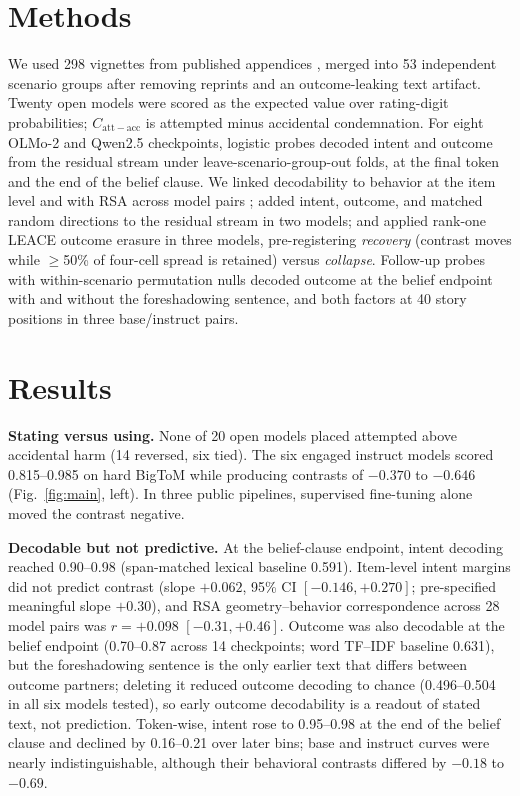 \documentclass{ccn}
\newcommand{\contrast}{C_{\mathrm{att-acc}}}
\begin{document}
\section{Methods}

We used 298 vignettes from published appendices \citep{young2008belief,young2009innocent,young2011ignorance}, merged into 53 independent scenario groups after removing reprints and an outcome-leaking text artifact.
Twenty open models were scored as the expected value over rating-digit probabilities; $\contrast$ is attempted minus accidental condemnation.
For eight OLMo-2 and Qwen2.5 checkpoints, logistic probes decoded intent and outcome from the residual stream under leave-scenario-group-out folds, at the final token and the end of the belief clause.
We linked decodability to behavior at the item level and with RSA across model pairs \citep{kriegeskorte2008rsa}; added intent, outcome, and matched random directions to the residual stream in two models; and applied rank-one LEACE outcome erasure \citep{belrose2023leace} in three models, pre-registering \emph{recovery} (contrast moves while $\geq$50\% of four-cell spread is retained) versus \emph{collapse}.
Follow-up probes with within-scenario permutation nulls decoded outcome at the belief endpoint with and without the foreshadowing sentence, and both factors at 40 story positions in three base/instruct pairs.

\section{Results}

\textbf{Stating versus using.}
None of 20 open models placed attempted above accidental harm (14 reversed, six tied).
The six engaged instruct models scored 0.815--0.985 on hard BigToM while producing contrasts of $-0.370$ to $-0.646$ (Fig.~\ref{fig:main}, left).
In three public pipelines, supervised fine-tuning alone moved the contrast negative.

\textbf{Decodable but not predictive.}
At the belief-clause endpoint, intent decoding reached 0.90--0.98 (span-matched lexical baseline 0.591).
Item-level intent margins did not predict contrast (slope $+0.062$, 95\% CI $[-0.146,+0.270]$; pre-specified meaningful slope $+0.30$), and RSA geometry--behavior correspondence across 28 model pairs was $r=+0.098$ $[-0.31,+0.46]$.
Outcome was also decodable at the belief endpoint (0.70--0.87 across 14 checkpoints; word TF--IDF baseline 0.631), but the foreshadowing sentence is the only earlier text that differs between outcome partners; deleting it reduced outcome decoding to chance (0.496--0.504 in all six models tested), so early outcome decodability is a readout of stated text, not prediction.
Token-wise, intent rose to 0.95--0.98 at the end of the belief clause and declined by 0.16--0.21 over later bins; base and instruct curves were nearly indistinguishable, although their behavioral contrasts differed by $-0.18$ to $-0.69$.
\end{document}
